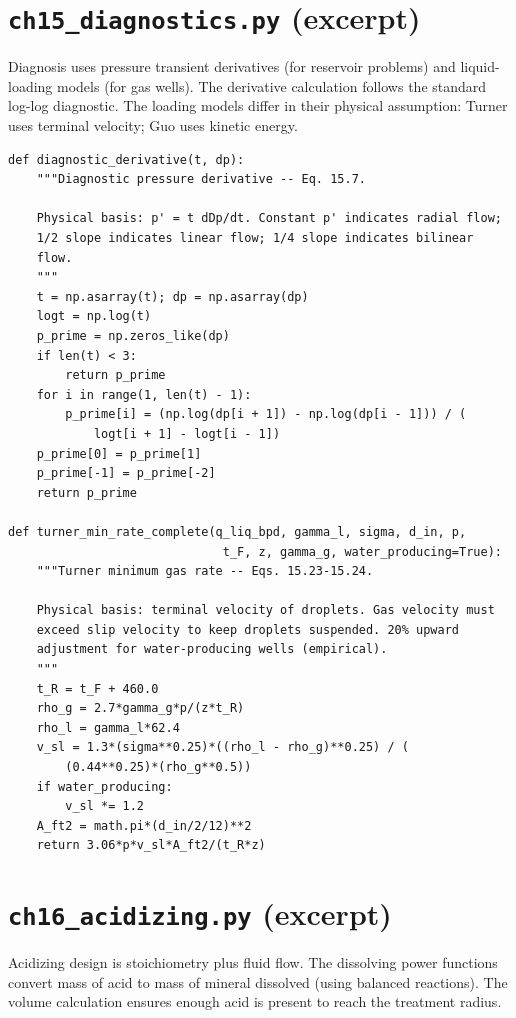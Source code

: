 \documentclass[11pt,a4paper,openany]{book}
\newcommand{\code}[1]{\texttt{#1}}
\begin{document}
\section{\code{ch15\_diagnostics.py} (excerpt)}

\begin{theory}
Diagnosis uses pressure transient derivatives (for reservoir
problems) and liquid-loading models (for gas wells). The derivative
calculation follows the standard log-log diagnostic. The loading
models differ in their physical assumption: Turner uses terminal
velocity; Guo uses kinetic energy.
\end{theory}

\begin{lstlisting}
def diagnostic_derivative(t, dp):
    """Diagnostic pressure derivative -- Eq. 15.7.

    Physical basis: p' = t dDp/dt. Constant p' indicates radial flow;
    1/2 slope indicates linear flow; 1/4 slope indicates bilinear
    flow.
    """
    t = np.asarray(t); dp = np.asarray(dp)
    logt = np.log(t)
    p_prime = np.zeros_like(dp)
    if len(t) < 3:
        return p_prime
    for i in range(1, len(t) - 1):
        p_prime[i] = (np.log(dp[i + 1]) - np.log(dp[i - 1])) / (
            logt[i + 1] - logt[i - 1])
    p_prime[0] = p_prime[1]
    p_prime[-1] = p_prime[-2]
    return p_prime

def turner_min_rate_complete(q_liq_bpd, gamma_l, sigma, d_in, p,
                              t_F, z, gamma_g, water_producing=True):
    """Turner minimum gas rate -- Eqs. 15.23-15.24.

    Physical basis: terminal velocity of droplets. Gas velocity must
    exceed slip velocity to keep droplets suspended. 20% upward
    adjustment for water-producing wells (empirical).
    """
    t_R = t_F + 460.0
    rho_g = 2.7*gamma_g*p/(z*t_R)
    rho_l = gamma_l*62.4
    v_sl = 1.3*(sigma**0.25)*((rho_l - rho_g)**0.25) / (
        (0.44**0.25)*(rho_g**0.5))
    if water_producing:
        v_sl *= 1.2
    A_ft2 = math.pi*(d_in/2/12)**2
    return 3.06*p*v_sl*A_ft2/(t_R*z)
\end{lstlisting}

\section{\code{ch16\_acidizing.py} (excerpt)}

\begin{theory}
Acidizing design is stoichiometry plus fluid flow. The dissolving
power functions convert mass of acid to mass of mineral dissolved
(using balanced reactions). The volume calculation ensures enough
acid is present to reach the treatment radius.
\end{theory}
\end{document}
